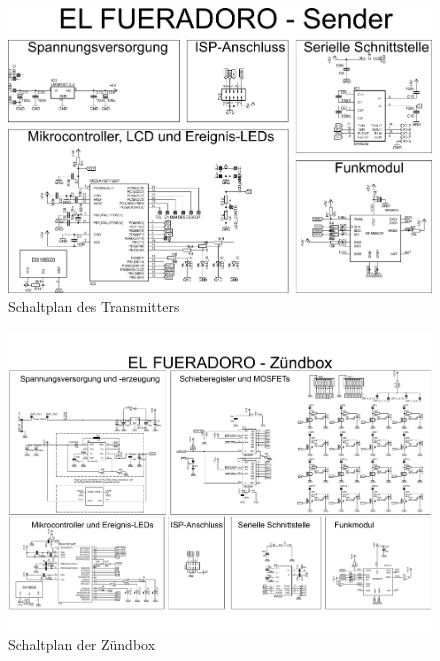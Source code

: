 \documentclass[paper=a4, parskip, numbers=noenddot, toc=listof, headsepline]{scrbook}
\begin{document}
		\begin{figure}
			\centering
			\includegraphics[angle=-90, width=.9\textwidth, keepaspectratio]{Bilder/Transmitterschaltplan}
			\caption{Schaltplan des Transmitters}
			\label{fig:transmitterschematic}
		\end{figure}

		\begin{figure}
			\centering
			\includegraphics[angle=90, height=.95\textheight,keepaspectratio]{Bilder/Zuendboxschaltplan}
			\caption{Schaltplan der Zündbox}
			\label{fig:zuendboxschematic}
		\end{figure}
\end{document}
